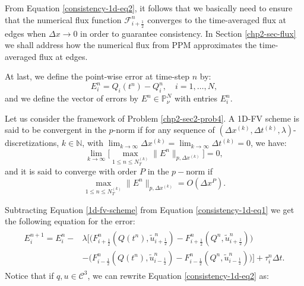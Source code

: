From Equation \eqref{consistency-1d-eq2}, it follows that we basically need to ensure that 
the numerical flux function $\mathcal{F}^n_{i+\frac{1}{2}}$ converges to the time-averaged flux at edges
when $\Delta x \to 0$ in order to guarantee consistency.
In Section \ref{chp2-sec-flux} we shall address how the numerical flux from PPM
approximates the time-averaged flux at edges.

At last, we define the point-wise error at time-step $n$ by:
\begin{equation*}
	E_i^n = Q_i(t^n) - Q_i^n, \quad i=1, \ldots, N,
\end{equation*}
and we define the vector of errors by $E^n \in \mathbb{P}^{N}_{\nu}$ with entries $E_i^n$.
\begin{definition}[Convergence]
	\label{chp2-def-conv}
	Let us consider the framework of Problem \ref{chp2-sec2-prob4}.
	A 1D-FV scheme is said to be convergent in the $p$-norm if for any sequence of $(\Delta x^{(k)}, \Delta t^{(k)},\lambda)$-discretizations, 
	$k \in \mathbb{N}$, with $\lim_{k\to \infty }{\Delta x^{(k)}} = \lim_{k\to \infty }{\Delta t^{(k)}} = 0$, we have:
	\begin{equation*}
		\lim_{k\to \infty}\bigg[ {\max_{1\leq n\leq N_T^{(k)}}}{\|E^n\|_{p,\Delta x^{(k)}}} \bigg] = 0,
	\end{equation*}
	and it is said to converge with order $P$ in the $p-$norm if
	\begin{equation*}
		{\max_{1\leq n\leq N_T^{(k)}}}{\|E^n\|_{p,\Delta x^{(k)}}} = O(\Delta x^P).
	\end{equation*}
\end{definition}
Subtracting Equation \eqref{1d-fv-scheme} from Equation \eqref{consistency-1d-eq1} we get
the following equation for the error:
\begin{align}
	\begin{split}
		\label{erroreq-1d-eq2}
		E^{n+1}_i = E^n_i -
		&\lambda
		\bigg[
		\bigg( {F}^n_{i+\frac{1}{2}}(Q(t^n),\tilde{u}^n_{i+\frac{1}{2}}) - {F}^n_{i+\frac{1}{2}}(Q^n,\tilde{u}^n_{i+\frac{1}{2}}) \bigg) \\
		&-\bigg( {F}^n_{i-\frac{1}{2}}(Q(t^n),\tilde{u}^n_{i-\frac{1}{2}}) - {F}^n_{i-\frac{1}{2}}(Q^n,\tilde{u}^n_{i-\frac{1}{2}}) \bigg)
		\bigg] 
		+ \tau_{i}^n \Delta t .
	\end{split}
\end{align}
Notice that if $q,u \in \mathcal{C}^3$, we can rewrite Equation \eqref{consistency-1d-eq2} as:
